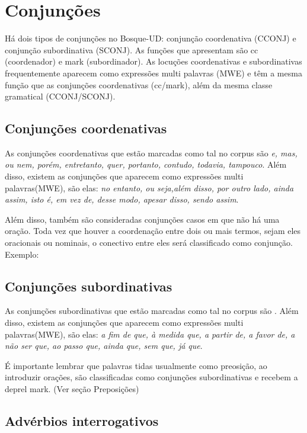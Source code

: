 \documentclass[output=paper,colorlinks,citecolor=brown]{langscibook}
\begin{document}
\section{Conjunções}

Há dois tipos de conjunções no Bosque-UD: conjunção coordenativa (CCONJ) e conjunção subordinativa (SCONJ). As funções que apresentam são cc (coordenador) e mark (subordinador). As locuções coordenativas e subordinativas frequentemente aparecem como expressões multi palavras (MWE) e têm a mesma função que as conjunções coordenativas (cc/mark), além da mesma classe gramatical (CCONJ/SCONJ).

\subsection{Conjunções coordenativas}

As conjunções coordenativas que estão marcadas como tal no corpus são \emph{e, mas, ou nem, porém, entretanto, quer, portanto, contudo, todavia, tampouco}. Além disso, existem as conjunções que aparecem como expressões multi palavras(MWE), são elas: \emph{no entanto, ou seja,além disso, por outro lado, ainda assim, isto é, em vez de, desse modo, apesar disso, sendo assim}.

Além disso, também são consideradas conjunções casos em que não há uma oração. Toda vez que houver a coordenação entre dois ou mais termos, sejam eles oracionais ou nominais, o conectivo entre eles será classificado como conjunção. Exemplo:



\subsection{Conjunções subordinativas}

As conjunções subordinativas que estão marcadas como tal no corpus são \emph{}. Além disso, existem as conjunções que aparecem como expressões multi palavras(MWE), são elas: \emph{a fim de que, à medida que, a partir de, a favor de, a não ser que, ao passo que, ainda que, sem que, já que}. 

É importante lembrar que palavras tidas usualmente como preosição, ao introduzir orações, são classificadas como conjunções subordinativas e recebem a deprel mark. (Ver seção Preposições)

\subsection{Advérbios interrogativos}
\end{document}

